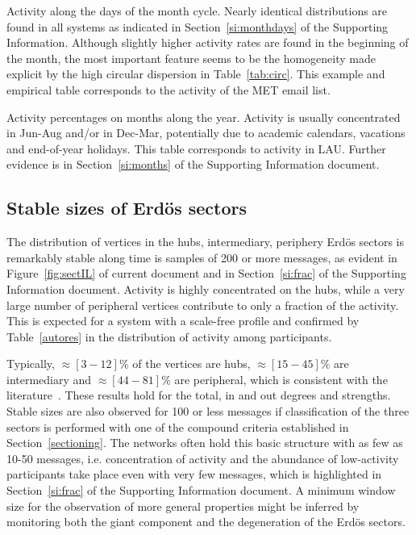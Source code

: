 \documentclass[%
	aip,
	jmp,%
	amsmath,amssymb,
	reprint,%
]{revtex4-1}
\begin{document}
\begin{table}
	\caption{Activity along the days of the month cycle.
	Nearly identical distributions are found in all systems
as indicated in Section~\ref{si:monthdays} of the Supporting Information. Although slightly higher activity rates are found in the beginning of the month, the most important feature seems to be the homogeneity made explicit by the high circular dispersion in Table~\ref{tab:circ}.
This example and empirical table corresponds to the activity of the MET email list.}
	\footnotesize
	
	\label{tab:min}
\end{table}

\begin{table}
	\caption{Activity percentages on months along the year.
		Activity is usually concentrated in Jun-Aug and/or in Dec-Mar,
		potentially due to academic calendars, vacations and end-of-year holidays.
	 This table corresponds to activity in LAU. 
		Further evidence is in Section~\ref{si:months} of the Supporting Information document.
	}
	\footnotesize
	
	\label{tab:min2}
\end{table}


\subsection{Stable sizes of Erd\"os sectors}\label{subsec:pih}

The distribution of vertices in the hubs, intermediary, periphery Erd\"os sectors 
is remarkably stable along time is samples of 200 or more messages,
as evident in Figure~\ref{fig:sectIL} of current document
and in Section~\ref{si:frac} of the Supporting Information document. 
Activity is highly concentrated on the hubs,
while a very large number of peripheral vertices contribute to only a fraction of the activity.
This is expected for a system with a scale-free profile
and confirmed by Table~\ref{autores} in the distribution of activity among participants.

Typically, $\approx [3-12]\%$ of the vertices are hubs,
$\approx [15-45]\%$ are intermediary and $\approx [44-81]\%$ are peripheral,
which is consistent with the literature~\cite{secFree}.
These results hold for the total, in and out degrees and strengths.
Stable sizes are also observed for 100 or less messages if classification 
of the three sectors is performed with one of the compound criteria established in Section~\ref{sectioning}. 
The networks often hold this basic structure with as few as 10-50 messages,
i.e. concentration of activity and the abundance of low-activity participants take place even with very few messages,
which is highlighted in Section~\ref{si:frac} of the Supporting Information document.
A minimum window size for the observation of more general properties might be inferred by monitoring 
both the giant component and the degeneration of the Erd\"os sectors.
\end{document}
